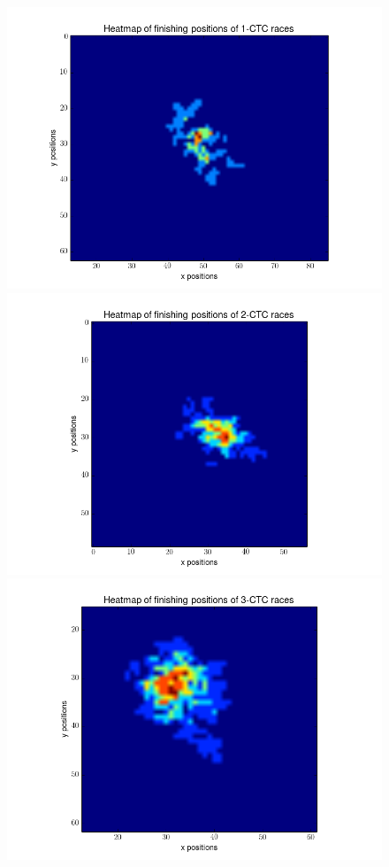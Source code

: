 \documentclass[12pt]{article}
\begin{document}
\begin{figure}[h]
	\centering
	\includegraphics[scale=0.40]{img/1ctc_heat}
	\includegraphics[scale=0.40]{img/2ctc_heat}
	\includegraphics[scale=0.40]{img/3ctc_heat}

\end{figure}
\end{document}
